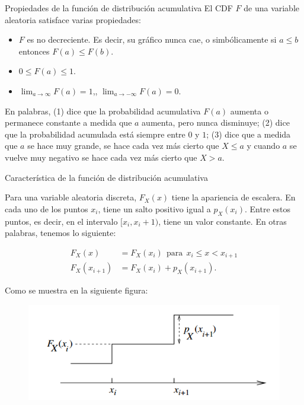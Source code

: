\documentclass[10pt]{beamer}
\begin{document}
\begin{frame}{Propiedades de la funci\'on de distribuci\'on acumulativa}
El CDF $F$ de una variable aleatoria satisface varias propiedades:
\begin{itemize}
	\item $F$ es no decreciente. Es decir, su gr\'afico nunca cae, o simb\'olicamente si $a \leq b$ entonces $F(a) \leq F(b)$.
	\item $0 \leq F(a) \leq 1$.
	\item $\lim_{a \rightarrow \infty}F(a) = 1$,\qquad, $\lim_{a \rightarrow -\infty}F(a) = 0$. 
\end{itemize}

\vspace{0.8cm}

\scriptsize{En palabras, (1) dice que la probabilidad acumulativa $F(a)$ aumenta o permanece constante a medida que $a$ aumenta, pero nunca disminuye; (2) dice que la probabilidad acumulada est\'a siempre entre $0$ y $1$; (3) dice que a medida que $a$ se hace muy grande, se hace cada vez m\'as cierto que $X \leq a$ y cuando $a$ se vuelve muy negativo se hace cada vez m\'as cierto que $X> a$.}

\end{frame}

\begin{frame}{Caracter\'istica de la  funci\'on de distribuci\'on acumulativa}

\small {Para una variable aleatoria discreta, $F_X(x)$ tiene la apariencia de escalera. En cada uno de los puntos $x_i$, tiene un salto positivo igual a $p_X(x_i)$. Entre estos puntos, es decir, en el intervalo $[x_i, x_i + 1)$, tiene un valor constante. En otras palabras,  tenemos lo siguiente:
	
	
	\begin{align*}
	F_X(x) &= F_X(x_i)\ \ \text{para}\ \ x_i \leq x < x_{i +1}\\
	F_X(x_{i + 1}) &= F_X(x_i) + p_{X}(x_{i + 1}).
	\end{align*}

Como se muestra en la siguiente figura:

\vspace{0.2cm}

\begin{figure}[ht]
	\centering
	\includegraphics[scale=.35]{v8.png}
\end{figure}
}
\end{frame}
\end{document}

